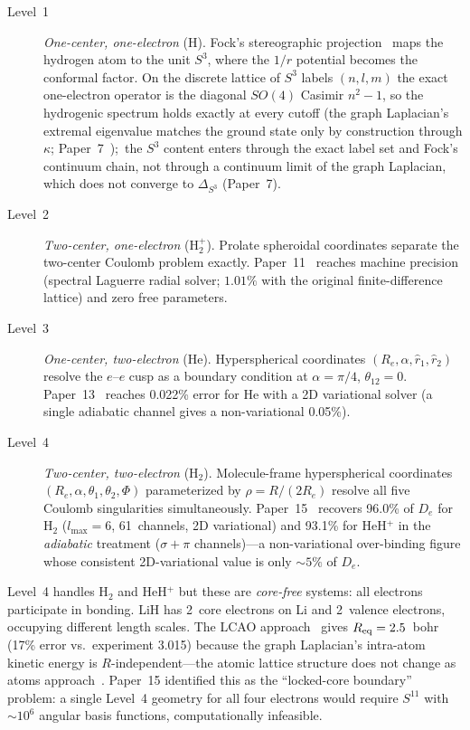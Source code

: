 \documentclass[aps,pra,twocolumn,superscriptaddress,longbibliography,floatfix]{revtex4-2}
\begin{document}
\begin{description}
\item[Level~1] \emph{One-center, one-electron} (H).
  Fock's stereographic projection~\cite{fock1935} maps the hydrogen atom
  to the unit $S^3$, where the $1/r$ potential becomes the conformal
  factor.  On the discrete lattice of $S^3$ labels $(n,l,m)$ the exact
  one-electron operator is the diagonal $SO(4)$ Casimir $n^2-1$, so the
  hydrogenic spectrum holds exactly at every cutoff (the graph
  Laplacian's extremal eigenvalue matches the ground state only by
  construction through $\kappa$; Paper~7~\cite{paper7});\ the $S^3$
  content enters through the exact label set and Fock's continuum
  chain, not through a continuum limit of the graph Laplacian, which %
  does not converge to $\Delta_{S^3}$ (Paper~7).

\item[Level~2] \emph{Two-center, one-electron} (H$_2^+$).
  Prolate spheroidal coordinates separate the two-center Coulomb problem
  exactly.  Paper~11~\cite{paper11} reaches machine precision
  (spectral Laguerre radial solver; $1.01\%$ with the original
  finite-difference lattice) and zero free parameters.

\item[Level~3] \emph{One-center, two-electron} (He).
  Hyperspherical coordinates $(R_e, \alpha, \hat{r}_1, \hat{r}_2)$
  resolve the $e$--$e$ cusp as a boundary condition at $\alpha=\pi/4$,
  $\theta_{12}=0$.  Paper~13~\cite{paper13} reaches 0.022\% error for
  He with a 2D variational solver (a single adiabatic channel gives a
  non-variational 0.05\%).

\item[Level~4] \emph{Two-center, two-electron} (H$_2$).
  Molecule-frame hyperspherical coordinates
  $(R_e, \alpha, \theta_1, \theta_2, \Phi)$ parameterized by
  $\rho = R/(2R_e)$ resolve all five Coulomb singularities simultaneously.
  Paper~15~\cite{paper15} recovers 96.0\% of $D_e$ for H$_2$
  ($l_{\max}=6$, 61~channels, 2D variational) and
  93.1\% for HeH$^+$ in the \emph{adiabatic} treatment ($\sigma{+}\pi$
  channels)---a non-variational over-binding figure whose consistent
  2D-variational value is only $\sim\!5\%$ of $D_e$.
\end{description}

Level~4 handles H$_2$ and HeH$^+$ but these are \emph{core-free}
systems: all electrons participate in bonding.  LiH has 2~core
electrons on Li and 2~valence electrons, occupying different length
scales.  The LCAO approach~\cite{fci_m} gives $R_{\rm eq} = 2.5$~bohr
(17\% error vs.\ experiment 3.015) because the graph Laplacian's
intra-atom kinetic energy is $R$-independent---the atomic lattice
structure does not change as atoms approach~\cite{fci_m}.
Paper~15 identified this as the ``locked-core boundary'' problem:
a single Level~4 geometry for all four electrons would require $S^{11}$
with ${\sim}10^6$ angular basis functions, computationally infeasible.
\end{document}
